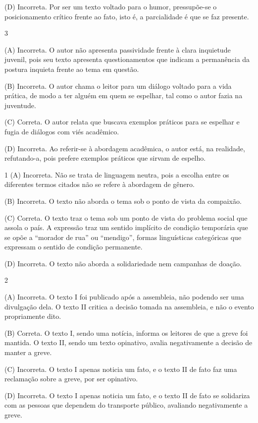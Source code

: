 (D) Incorreta. Por ser
um texto voltado para o humor, pressupõe-se o posicionamento crítico
frente ao fato, isto é, a parcialidade é que se faz presente.

\num{3}

(A) Incorreta. O autor não apresenta passividade frente à clara
inquietude juvenil, pois seu texto apresenta questionamentos que indicam
a permanência da postura inquieta frente ao tema em questão. 

(B)
Incorreta. O autor chama o leitor para um diálogo voltado para a vida
prática, de modo a ter alguém em quem se espelhar, tal como o autor
fazia na juventude. 

(C) Correta. O autor relata que buscava exemplos
práticos para se espelhar e fugia de diálogos com viés acadêmico. 

(D)
Incorreta. Ao referir-se à abordagem acadêmica, o autor está, na
realidade, refutando-a, pois prefere exemplos práticos que sirvam de
espelho.


\num{1}
(A) Incorreta. Não se trata de linguagem neutra, pois a escolha entre os
diferentes termos citados não se refere à abordagem de gênero. 

(B)
Incorreta. O texto não aborda o tema sob o ponto de vista da compaixão.

(C) Correta. O texto traz o tema sob um ponto de vista do problema
social que assola o país. A expressão traz um sentido implícito de
condição temporária que se opõe a ``morador de rua'' ou ``mendigo'',
formas linguísticas categóricas que expressam o sentido de condição
permanente. 

(D) Incorreta. O texto não aborda a solidariedade nem
campanhas de doação.

\num{2}

(A) Incorreta. O texto I foi publicado após a assembleia, não podendo
ser uma divulgação dela. O texto II critica a decisão tomada na
assembleia, e não o evento propriamente dito. 

(B) Correta. O texto I,
sendo uma notícia, informa os leitores de que a greve foi mantida. O
texto II, sendo um texto opinativo, avalia negativamente a decisão de
manter a greve. 

(C) Incorreta. O texto I apenas noticia um fato, e o
texto II de fato faz uma reclamação sobre a greve, por ser opinativo.

(D) Incorreta. O texto I apenas noticia um fato, e o texto II de fato se
solidariza com as pessoas que dependem do transporte público, avaliando
negativamente a greve.

